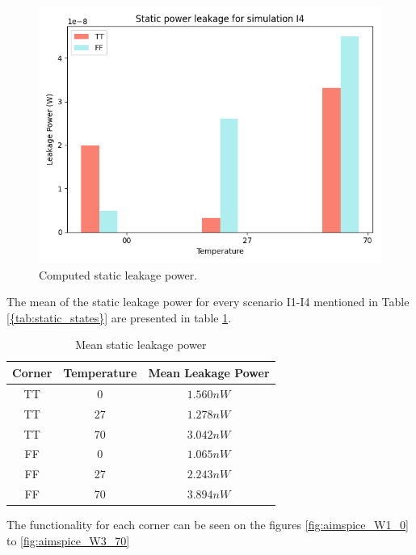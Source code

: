 \begin{figure}[H]
    \vspace{5pt}
    \includegraphics[height= 0.21\textheight]{figures/aimspice/0.600_0.1u_0.1u_0.300u_0.1u/leakage_data/leakage_power_I11.png}
    \vspace{5pt}
    \caption{Computed static leakage power.}
    \label{fig:static_leakage_power_bar}
\end{figure}

The mean of the static leakage power for every scenario I1-I4 mentioned in Table \ref{{tab:static_states}} are presented in table \ref{tab:leakage_power}.

\begin{table}[H]
    \centering
    \caption{Mean static leakage power}
    \label{tab:leakage_power}
    \begin{tabular}{ccc}
    \hline
    \textbf{Corner} & \textbf{Temperature} & \textbf{Mean Leakage Power} \\
    \hline
    TT & 0  & $1.560 nW$\\
    TT & 27 & $1.278 nW$\\
    TT & 70 & $3.042 nW$\\
    FF & 0  & $1.065 nW$\\
    FF & 27 & $2.243 nW$\\
    FF & 70 & $3.894 nW$\\
    \end{tabular}
\end{table}

The functionality for each corner can be seen on the figures \ref{fig:aimspice_W1_0} to \ref{fig:aimspice_W3_70}


